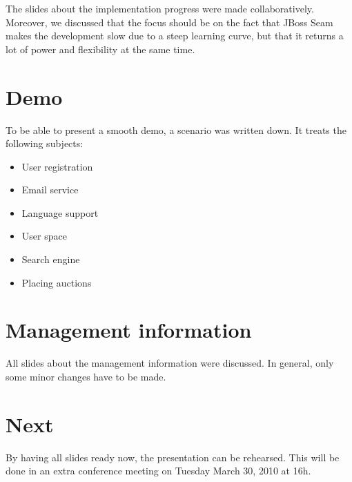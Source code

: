 \documentclass[a4paper, 12pt]{article}
\begin{document}
The slides about the implementation progress were made collaboratively. Moreover, we discussed that the focus should be on the fact that JBoss Seam makes the development slow due to a steep learning curve, but that it returns a lot of power and flexibility at the same time. 

\section{Demo}

To be able to present a smooth demo, a scenario was written down. It treats the following subjects:
\begin{itemize}
	\item User registration
	\item Email service
	\item Language support
	\item User space
	\item Search engine
	\item Placing auctions
\end{itemize}


\section{Management information}

All slides about the management information were discussed. In general, only some minor changes have to be made. 



\section{Next}

By having all slides ready now, the presentation can be rehearsed. This will be done in an extra conference meeting on Tuesday March 30, 2010 at 16h.

		
\end{document}
